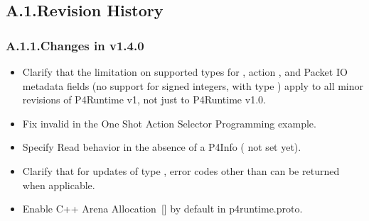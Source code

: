 \documentclass[11pt]{article}
\begin{document}
{%
\subsection{A.1.\hspace*{0.5em}Revision History}\label{sec-revision-history}%

\subsubsection{A.1.1.\hspace*{0.5em}Changes in v1.4.0}\label{sec-changes-in-v140}%

\begin{itemize}[noitemsep,topsep=\mdcompacttopsep]%

\item{}Clarify that the limitation on supported types for , action
, and Packet IO metadata fields (no support for signed integers, with
type ) apply to all minor revisions of P4Runtime v1, not just to
P4Runtime v1.0.%

\item{}Fix invalid  in the One Shot Action Selector Programming
example.%

\item{}Specify Read behavior in the absence of a P4Info (
not set yet).%

\item{}Clarify that for updates of type , error codes other than
 can be returned when applicable.%

\item{}Enable C++ Arena Allocation~[] by default in p4runtime.proto.%


\end{itemize}}
\end{document}
